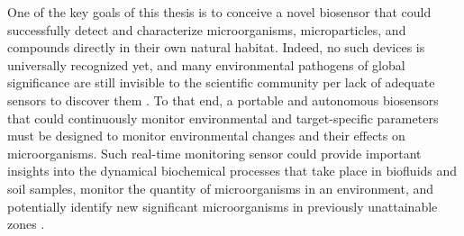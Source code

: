 One of the key goals of this thesis is to conceive a novel biosensor that could successfully detect and characterize microorganisms, microparticles, and compounds directly in their own natural habitat. Indeed, no such devices is universally recognized yet, and many environmental pathogens of global significance are still invisible to the scientific community per lack of adequate sensors to discover them \cite{Hutchins2019}. To that end, a portable and autonomous biosensors that could continuously monitor environmental and target-specific parameters must be designed to monitor environmental changes and their effects on microorganisms. Such real-time monitoring sensor could provide important insights into the dynamical biochemical processes that take place in biofluids and soil samples, monitor the quantity of microorganisms in an environment, and potentially identify new significant microorganisms in previously unattainable zones \cite{Kim2019,Hutchins2019}. \par